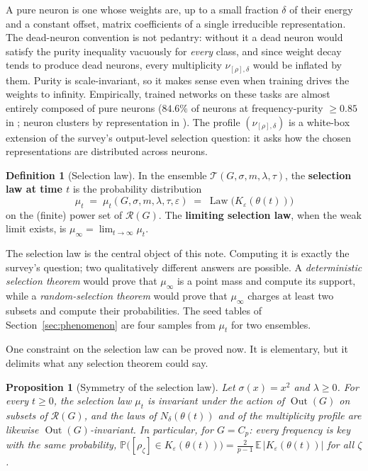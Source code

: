 \documentclass[11pt]{amsart}
\theoremstyle{plain}
\newtheorem{proposition}[theorem]{Proposition}
\theoremstyle{definition}
\newtheorem{definition}[theorem]{Definition}
\DeclareMathOperator{\Out}{Out}
\newcommand{\E}{\mathbb{E}}
\newcommand{\Prob}{\mathbb{P}}
\newcommand{\Rcl}{\mathcal{R}}
\begin{document}
A pure neuron is one whose weights are, up to a small fraction $\delta$ of their energy and a constant offset, matrix coefficients of a single irreducible representation. The dead-neuron convention is not pedantry: without it a dead neuron would satisfy the purity inequality vacuously for \emph{every} class, and since weight decay tends to produce dead neurons, every multiplicity $\nu_{[\rho],\delta}$ would be inflated by them. Purity is scale-invariant, so it makes sense even when training drives the weights to infinity. Empirically, trained networks on these tasks are almost entirely composed of pure neurons ($84.6\%$ of neurons at frequency-purity $\geq 0.85$ in \cite{nanda2023}; neuron clusters by representation in \cite{chughtai2023}). The profile $(\nu_{[\rho],\delta})$ is a white-box extension of the survey's output-level selection question: it asks how the chosen representations are distributed across neurons.

\begin{definition}[Selection law]\label{def:law}
In the ensemble $\mathcal{T}(G,\sigma,m,\lambda,\tau)$, the \textbf{selection law at time $t$} is the probability distribution
\[
   \mu_t \;=\; \mu_t(G,\sigma,m,\lambda,\tau,\varepsilon)
   \;=\; \operatorname{Law}\bigl( K_\varepsilon(\theta(t)) \bigr)
\]
on the (finite) power set of $\Rcl(G)$. The \textbf{limiting selection law}, when the weak limit exists, is $\mu_\infty = \lim_{t \to \infty} \mu_t$.
\end{definition}

The selection law is the central object of this note. Computing it is exactly the survey's question; two qualitatively different answers are possible. A \emph{deterministic selection theorem} would prove that $\mu_\infty$ is a point mass and compute its support, while a \emph{random-selection theorem} would prove that $\mu_\infty$ charges at least two subsets and compute their probabilities. The seed tables of Section~\ref{sec:phenomenon} are four samples from $\mu_t$ for two ensembles.

One constraint on the selection law can be proved now. It is elementary, but it delimits what any selection theorem could say.

\begin{proposition}[Symmetry of the selection law]\label{prop:symmetry}
Let $\sigma(x) = x^2$ and $\lambda \geq 0$. For every $t \geq 0$, the selection law $\mu_t$ is invariant under the action of $\Out(G)$ on subsets of $\Rcl(G)$, and the laws of $N_\delta(\theta(t))$ and of the multiplicity profile are likewise $\Out(G)$-invariant. In particular, for $G = C_p$: every frequency is key with the same probability, $\Prob\bigl([\rho_\zeta] \in K_\varepsilon(\theta(t))\bigr) = \frac{2}{p-1}\, \E\, |K_\varepsilon(\theta(t))|$ for all $\zeta$.
\end{proposition}
\end{document}
